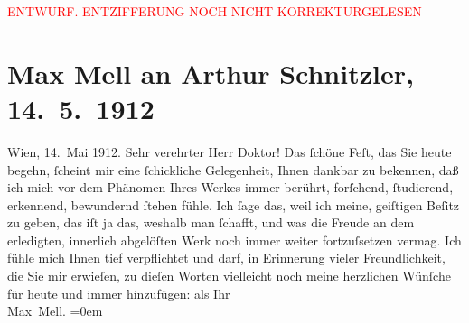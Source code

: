 
\begin{center}
            \textcolor{red}{ENTWURF. ENTZIFFERUNG NOCH NICHT KORREKTURGELESEN}
                      \end{center}
            
               \section[Max Mell an Arthur Schnitzler, 14. 5. 1912]{ Max Mell an Arthur Schnitzler, 14. 5. 1912}\nopagebreak{}\rehead{ }\begin{ledgroupsized}[t]{13cm}\normalsize\beginnumbering{} \toendnotes[C]{\smallbreak\pagebreak[2]} 
\pstart
           \raggedleft{}{\pb}Wien, 14. Mai 1912.\pend
           \pstart{}Sehr verehrter Herr Doktor!\pend\pstart
           Das ſchöne Feſt, das Sie heute begehn, ſcheint mir eine ſchickliche Gelegenheit, Ihnen
               dankbar zu bekennen, daß ich mich vor dem Phänomen Ihres Werkes immer berührt,
               forſchend, ſtudierend, erkennend, bewundernd ſtehen fühle. Ich ſage das, weil ich
               meine, geiſtigen Beſitz zu geben, das iſt ja das, weshalb man ſchafft, und was die
               Freude an dem erledigten, innerlich abgelöſten Werk noch immer weiter fortzuſsetzen
               vermag. Ich fühle mich Ihnen tief verpflichtet und darf, in Erinnerung vieler
               Freundlichkeit, die Sie mir erwieſen, zu dieſen Worten vielleicht noch meine
               herzlichen Wünſche für heute und immer hinzufügen:\pend
           \pstart
           als Ihr{\\[\baselineskip]}\spacefill\mbox{Max Mell.}\pend
           \leftskip=0em{}\endnumbering{}\end{ledgroupsized}  \newcommand{\dateiname}{L02065}\newcommand{\titel}{Max Mell an Arthur Schnitzler, 14. 5. 1912}\newcommand{\editorInnen}{Martin Anton Müller und Gerd-Hermann Susen}
      